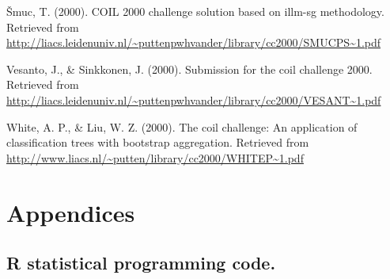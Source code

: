 \documentclass[man]{apa6}
\begin{document}
\leavevmode\hypertarget{ref-Smuc}{}%
Šmuc, T. (2000). COIL 2000 challenge solution based on illm-sg methodology. Retrieved from \url{http://liacs.leidenuniv.nl/~puttenpwhvander/library/cc2000/SMUCPS~1.pdf}

\leavevmode\hypertarget{ref-Vesanto}{}%
Vesanto, J., \& Sinkkonen, J. (2000). Submission for the coil challenge 2000. Retrieved from \url{http://liacs.leidenuniv.nl/~puttenpwhvander/library/cc2000/VESANT~1.pdf}

\leavevmode\hypertarget{ref-White}{}%
White, A. P., \& Liu, W. Z. (2000). The coil challenge: An application of classification trees with bootstrap aggregation. Retrieved from \url{http://www.liacs.nl/~putten/library/cc2000/WHITEP~1.pdf}

\endgroup

\newpage

\hypertarget{appendices}{%
\section{Appendices}\label{appendices}}

\hypertarget{r-statistical-programming-code.}{%
\subsection{R statistical programming code.}\label{r-statistical-programming-code.}}
\end{document}
